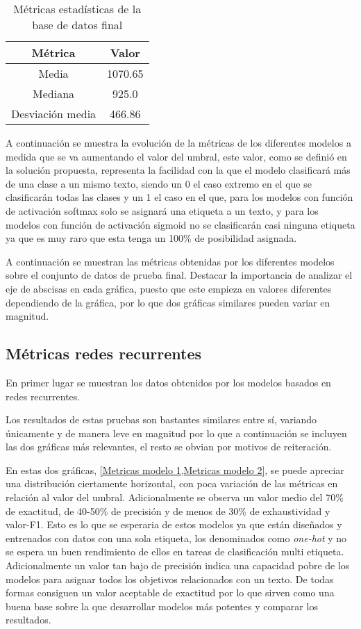 \begin{table}[H]
    \begin{tabular}{| c | c |}
        \hline
        Métrica & Valor\\
        \hline \hline
        Media            & 1070.65\\ \hline
        Mediana          & 925.0\\ \hline
        Desviación media & 466.86\\ \hline
    \end{tabular}
    \caption{Métricas estadísticas de la base de datos final}
    \label{table:Metricas estadisticas de la base de datos final}
\end{table}

A continuación se muestra la evolución de la métricas de los diferentes modelos
a medida que se va aumentando el valor del umbral, este valor, como se
definió en la solución propuesta, representa la facilidad con la
que el modelo clasificará más de una clase a un mismo texto, siendo un 0 el caso
extremo en el que se clasificarán todas las clases y un 1 el caso en el que,
para los modelos con función de activación softmax solo se asignará una etiqueta
a un texto, y para los modelos con función de activación sigmoid no se
clasificarán casi ninguna etiqueta ya que es muy raro que esta tenga un 100\% de
posibilidad asignada. 

A continuación se muestran las métricas obtenidas por los diferentes modelos
sobre el conjunto de datos de prueba final. Destacar la importancia de
analizar el eje de abscisas en cada gráfica, puesto que este empieza en valores
diferentes dependiendo de la gráfica, por lo que dos gráficas similares pueden
variar en magnitud.

\subsection{Métricas redes recurrentes}En primer lugar se muestran los datos
obtenidos por los modelos basados en redes recurrentes.

Los resultados de estas pruebas son bastantes similares entre sí, variando
únicamente y de manera leve en magnitud por lo que a continuación se incluyen
las dos gráficas más relevantes, el resto se obvian por motivos de reiteración. 

En estas dos gráficas, \cref{Metricas modelo 1,Metricas modelo 2}, se puede apreciar
una distribución ciertamente horizontal, con poca variación de las métricas en
relación al valor del umbral. Adicionalmente se observa un valor medio del 70\%
de exactitud, de 40-50\% de precisión y de menos de 30\% de exhaustividad y
valor-F1. Esto es lo que se esperaria de estos modelos ya que están diseñados y
entrenados con datos con una sola etiqueta, los denominados como
\textit{one-hot} y no se espera un buen rendimiento de ellos en tareas de
clasificación multi etiqueta. Adicionalmente un valor tan bajo de precisión
indica una capacidad pobre de los modelos para asignar todos los objetivos
relacionados con un texto. De todas formas consiguen un valor aceptable de
exactitud por lo que sirven como una buena base sobre la que desarrollar modelos
más potentes y comparar los resultados. 


